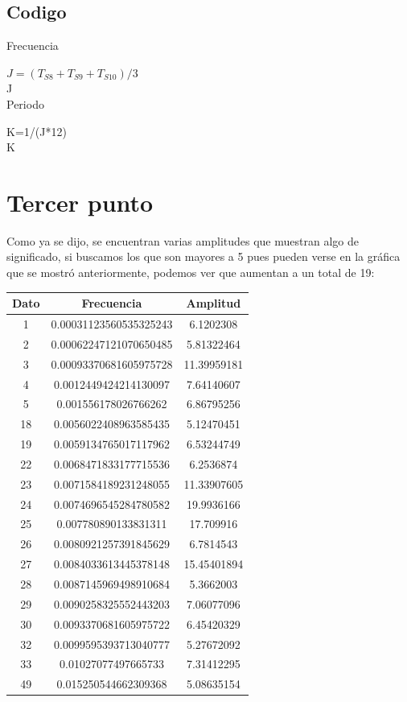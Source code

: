 \documentclass[a4paper,12pt]{article}
\begin{document}
\subsection{Codigo}
\noindent
Frecuencia

$J=(T_{S8}+T_{S9} +T_{S10})/3$\\
J
\\[0.05cm]
\noindent
Periodo

K=1/(J*12)\\
K
\section{Tercer punto}
\noindent
Como ya se dijo, se encuentran varias amplitudes que muestran algo de significado, si buscamos los que son mayores a 5 pues pueden verse en la gráfica que se mostró anteriormente, podemos ver que aumentan a un total de 19:
\begin{center}
\begin{tabular}{|c|c|c|}
\hline
Dato & Frecuencia & Amplitud \\ \hline
1 & 0.00031123560535325243 &6.1202308 \\ \hline  
2 &0.00062247121070650485 &5.81322464\\ \hline
3 & 0.00093370681605975728 &11.39959181\\ \hline
4 &0.0012449424214130097 &7.64140607\\ \hline
5 &0.001556178026766262 &6.86795256\\ \hline
18 & 0.0056022408963585435 &5.12470451\\ \hline
19 &0.0059134765017117962 &6.53244749\\ \hline
22 &0.0068471833177715536 &6.2536874\\ \hline
23 & 0.0071584189231248055 &11.33907605\\ \hline
24 &0.0074696545284780582 &19.9936166\\ \hline
25 &0.007780890133831311 &17.709916\\ \hline
26 &0.0080921257391845629 &6.7814543\\ \hline
27 &0.0084033613445378148 &15.45401894\\ \hline
28 &0.0087145969498910684 &5.3662003\\ \hline 
29 &0.0090258325552443203 &7.06077096\\ \hline
30 &0.0093370681605975722 &6.45420329\\ \hline
32 & 0.0099595393713040777 &5.27672092\\ \hline
33 &0.01027077497665733 &7.31412295\\ \hline
49 &0.015250544662309368 &5.08635154 \\ \hline
\end{tabular}
\end{center}
\end{document}
